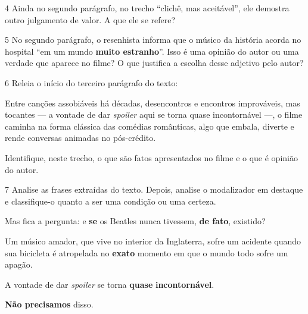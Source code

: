 
\num{4} Ainda no segundo parágrafo, no trecho ``clichê, mas aceitável'',
ele demostra outro julgamento de valor. A que ele se refere?


\num{5} No segundo parágrafo, o resenhista informa que o músico da
história acorda no hospital ``em um mundo \textbf{muito estranho}''.
Isso é uma opinião do autor ou uma verdade que aparece no filme? O que
justifica a escolha desse adjetivo pelo autor?


\num{6} Releia o início do terceiro parágrafo do texto:

\begin{myquote}
Entre canções assobiáveis há décadas, desencontros e encontros
improváveis, mas tocantes — a vontade de dar \emph{spoiler} aqui se
torna quase incontornável —, o filme caminha na forma clássica das
comédias românticas, algo que embala, diverte e rende conversas animadas
no pós-crédito.
\end{myquote}

\noindent Identifique, neste trecho, o que são fatos apresentados no filme e o que
é opinião do autor.


\num{7} Analise as frases extraídas do texto. Depois, analise o
modalizador em destaque e classifique-o quanto a ser uma condição ou uma
certeza.

\begin{escolha}
\item Mas fica a pergunta: e \textbf{{se}} os Beatles nunca tivessem,
\textbf{{de fato}}, existido? 
\item Um músico amador, que vive no interior da Inglaterra, sofre um
acidente quando sua bicicleta é atropelada no \textbf{{exato}} momento
em que o mundo todo sofre um apagão. 
\item A vontade de dar \emph{spoiler} se torna \textbf{{quase}}
\textbf{{incontornável}}. 
\item \textbf{{Não precisamos}} disso. 
\end{escolha}

